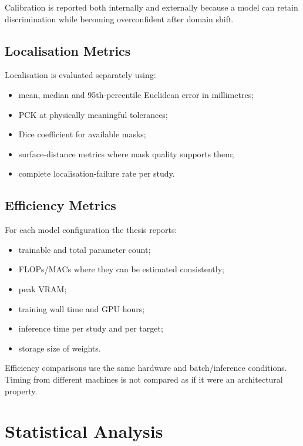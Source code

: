 Calibration is reported both internally and externally because a model can
retain discrimination while becoming overconfident after domain shift.

\subsection{Localisation Metrics}
\label{sec:method-localisation-metrics}

Localisation is evaluated separately using:

\begin{itemize}
  \item mean, median and 95th-percentile Euclidean error in millimetres;
  \item PCK at physically meaningful tolerances;
  \item Dice coefficient for available masks;
  \item surface-distance metrics where mask quality supports them;
  \item complete localisation-failure rate per study.
\end{itemize}

\subsection{Efficiency Metrics}
\label{sec:method-efficiency}

For each model configuration the thesis reports:

\begin{itemize}
  \item trainable and total parameter count;
  \item FLOPs/MACs where they can be estimated consistently;
  \item peak VRAM;
  \item training wall time and GPU hours;
  \item inference time per study and per target;
  \item storage size of weights.
\end{itemize}

Efficiency comparisons use the same hardware and batch/inference conditions.
Timing from different machines is not compared as if it were an architectural
property.

\section{Statistical Analysis}
\label{sec:method-statistics}

